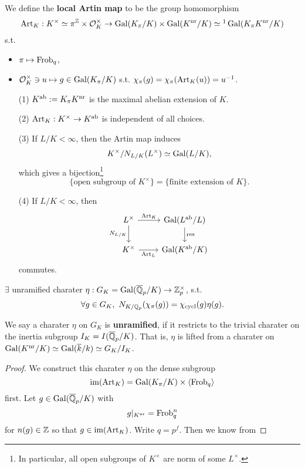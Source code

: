 We define the \textbf{local Artin map} to be the group homomorphism
\[\art_K : K^\times\simeq \pi^\Z\times \O_K^\times\to \gal(K_\pi/K)\times\gal(K^\nr/K)\simeq\footnotemark\gal(K_\pi K^\nr/K)\]
s.t.\begin{itemize}
    \item $\pi\mapsto \operatorname{Frob}_q$,
    \item $\mathcal{O}_K^\times\ni u\mapsto g\in\operatorname{Gal}(K_\pi/K)$ s.t. $\chi_\pi(g) = \chi_\pi(\operatorname{Art}_K(u)) = u^{-1}$.
\end{itemize}
\begin{theorem}
    \begin{enumerate}
        \item [(1)] $K^{\mathrm{ab}} := K_\pi K^{\mathrm{nr}}$ is the maximal abelian extension of $K$.
        \item [(2)] $\operatorname{Art}_K : K^\times\to K^{\mathrm{ab}}$ is independent of all choices.
        \item [(3)] If $L/K < \infty$, then the Artin map induces \[K^\times/N_{L/K}(L^\times)\simeq\operatorname{Gal}(L/K),\]
        which gives a bijection\footnote{
            In particular, all open subgroups of $K^\times$ are norm of some $L^\times$.
        }\[\{\text{open subgroup of }K^\times\} = \{\text{finite extension of }K\}.\]
        \item [(4)] If $L/K < \infty$,
        then %
        \[\begin{tikzcd}
            {L^\times} & {\gal(L^\ab/L)} \\
            {K^\times} & {\gal(K^\ab/K)}
            \arrow["{\art_K}", from=1-1, to=1-2]
            \arrow["{N_{L/K}}"', from=1-1, to=2-1]
            \arrow["{\mathrm{res}}", from=1-2, to=2-2]
            \arrow["{\art_L}"', from=2-1, to=2-2]
        \end{tikzcd}\]commutes.
    \end{enumerate}
\end{theorem}

\begin{corollary}\label{norm of lubin-tate char = cycl char * unramified char}
    $\exists$ unramified charater $\eta : G_K = \operatorname{Gal}(\overline{\mathbb{Q}}_p/K)\to\mathbb{Z}_p^\times$, s.t.\[\forall g\in G_K,\ N_{K/\mathbb{Q}_p}(\chi_\pi(g)) = \chi_{\mathrm{cycl}}(g)\eta(g).\]
\end{corollary}
We say a charater $\eta$ on $G_K$ is \textbf{unramified}, if it restricts to the trivial charater on the inertia subgroup $I_K = I(\overline{\mathbb{Q}}_p/K)$.
That is, $\eta$ is lifted from a charater on $\operatorname{Gal}(K^{\mathrm{nr}}/K)\simeq\operatorname{Gal}(\overline k/k)\simeq G_K/ I_K$.
\begin{proof}
    We construct this charater $\eta$ on the dense subgroup \[\operatorname{im}(\operatorname{Art}_K) = \operatorname{Gal}(K_\pi/K)\times\left\langle \operatorname{Frob}_q \right\rangle\] first.
    Let $g\in\operatorname{Gal}(\overline{\mathbb{Q}}_p/K)$ with \[g|_{K^{\mathrm{nr}}} = \operatorname{Frob}_q^n\] for $n(g)\in\mathbb{Z}$ so that $g\in \operatorname{im}(\operatorname{Art}_K)$.
    Write $q = p^f$.
    Then we know from 

\end{proof}

